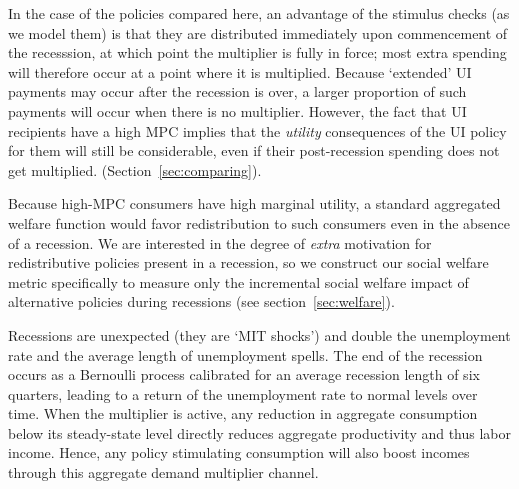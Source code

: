 \documentclass[../HAFiscal]{subfiles}
\begin{document}
In the case of the policies compared here, an advantage of the stimulus checks (as we model them) is that they are distributed immediately upon commencement of the recesssion, at which point the multiplier is fully in force; most extra spending will therefore occur at a point where it is multiplied.  Because `extended' UI payments may occur after the recession is over, a larger proportion of such payments will occur when there is no multiplier.  However, the fact that UI recipients have a high MPC implies that the \textit{utility} consequences of the UI policy for them will still be considerable, even if their post-recession spending does not get multiplied.  (Section~\ref{sec:comparing}).

Because high-MPC consumers have high marginal utility, a standard aggregated welfare function would favor redistribution to such consumers even in the absence of a recession. We are interested in the degree of \textit{extra} motivation for redistributive policies present in a recession, so we construct our social welfare metric specifically to measure only the incremental social welfare impact of alternative policies during recessions (see section~\ref{sec:welfare}).


Recessions are unexpected (they are `MIT shocks') and double the unemployment rate and the average length of unemployment spells. The end of the recession occurs as a Bernoulli process calibrated for an average recession length of six quarters, leading to a return of the unemployment rate to normal levels over time. When the multiplier is active, any reduction in aggregate consumption below its steady-state level directly reduces aggregate productivity and thus labor income. Hence, any policy stimulating consumption will also boost incomes through this aggregate demand multiplier channel.

\end{document}
